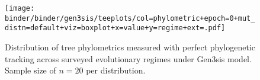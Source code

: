\begin{figure*}
  \centering
    \texttt{[image: binder/binder/gen3sis/teeplots/col=phylometric+epoch=0+mut\_distn=default+viz=boxplot+x=value+y=regime+ext=.pdf]}
  \caption{%
    Distribution of tree phylometrics measured with perfect phylogenetic tracking across surveyed evolutionary regimes under Gen3sis model.
    Sample size of $n=20$ per distribution.
  }
  \label{fig:perfect-tree-phylometrics-gen3sis}
\end{figure*}
